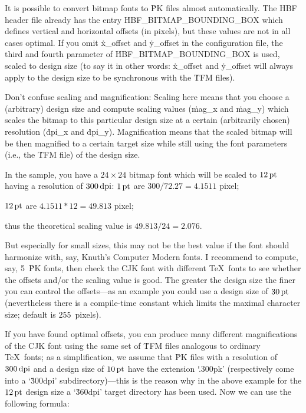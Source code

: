 \medskip

It is possible to convert bitmap fonts to \.{PK} files almost
automatically. The HBF header file already has the entry
\.{HBF\_BITMAP\_BOUNDING\_BOX} which defines vertical and horizontal offsets
(in pixels), but these values are not in all cases optimal. If you omit
\.{x\_offset} and \.{y\_offset} in the configuration file, the third and
fourth parameter of \.{HBF\_BITMAP\_BOUNDING\_BOX} is used, scaled to design
size (to say it in other words: \.{x\_offset} and \.{y\_offset} will always
apply to the design size to be synchronous with the \.{TFM} files).

Don't confuse scaling and magnification: Scaling here means that you choose
a (arbitrary) design size and compute scaling values (\.{mag\_x} and
\.{mag\_y}) which scales the bitmap to this particular design size at a
certain (arbitrarily chosen) resolution (\.{dpi\_x} and \.{dpi\_y}).
Magnification means that the scaled bitmap will be then magnified to a
certain target size while still using the font parameters (i.e., the
\.{TFM} file) of the design size.

In the sample, you have a $24 \times 24$ bitmap font which will be scaled to
$12\,\hbox{pt}$ having a resolution of $300\,\hbox{dpi}$:
\medskip
\quad $1\,\hbox{pt}$ are $300 / 72.27 = 4.1511$ pixel;

\quad $12\,\hbox{pt}$ are $4.1511 * 12 = 49.813$ pixel;

\quad thus the theoretical scaling value is $49.813 / 24 = 2.076$.

\medskip

But especially for small sizes, this may not be the best value if the font
should harmonize with, say, Knuth's Computer Modern fonts. I recommend to
compute, say, 5~\.{PK} fonts, then check the CJK font with different \TeX\
fonts to see whether the offsets and/or the scaling value is good. The
greater the design size the finer you can control the offsets---as an
example you could use a design size of $30\,\hbox{pt}$ (nevertheless there
is a compile-time constant \PB{\.{MAX\_CHAR\_SIZE}} which limits the maximal
character size; default is 255~pixels).

If you have found optimal offsets, you can produce many different
magnifications of the CJK font using the same set of \.{TFM} files
analogous to ordinary \TeX\ fonts; as a simplification, we assume that
\.{PK} files with a resolution of $300\,\hbox{dpi}$ and a design size of
$10\,\hbox{pt}$ have the extension `\.{.300pk}' (respectively come into a
`\.{300dpi}' subdirectory)---this is the reason why in the above example for
the $12\,\hbox{pt}$ design size a `\.{360dpi}' target directory has been
used. Now we can use the following formula:

